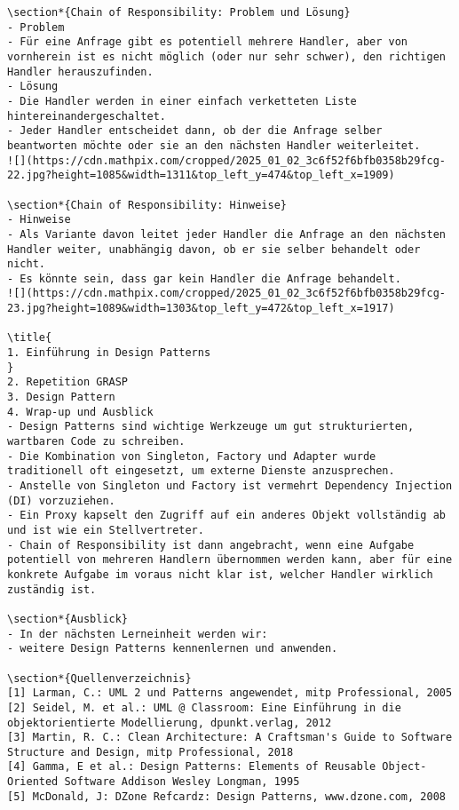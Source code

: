 \documentclass[10pt]{article}
\begin{document}
\begin{verbatim}
\section*{Chain of Responsibility: Problem und Lösung}
- Problem
- Für eine Anfrage gibt es potentiell mehrere Handler, aber von vornherein ist es nicht möglich (oder nur sehr schwer), den richtigen Handler herauszufinden.
- Lösung
- Die Handler werden in einer einfach verketteten Liste hintereinandergeschaltet.
- Jeder Handler entscheidet dann, ob der die Anfrage selber beantworten möchte oder sie an den nächsten Handler weiterleitet.
![](https://cdn.mathpix.com/cropped/2025_01_02_3c6f52f6bfb0358b29fcg-22.jpg?height=1085&width=1311&top_left_y=474&top_left_x=1909)

\section*{Chain of Responsibility: Hinweise}
- Hinweise
- Als Variante davon leitet jeder Handler die Anfrage an den nächsten Handler weiter, unabhängig davon, ob er sie selber behandelt oder nicht.
- Es könnte sein, dass gar kein Handler die Anfrage behandelt.
![](https://cdn.mathpix.com/cropped/2025_01_02_3c6f52f6bfb0358b29fcg-23.jpg?height=1089&width=1303&top_left_y=472&top_left_x=1917)

\title{
1. Einführung in Design Patterns
}
2. Repetition GRASP
3. Design Pattern
4. Wrap-up und Ausblick
- Design Patterns sind wichtige Werkzeuge um gut strukturierten, wartbaren Code zu schreiben.
- Die Kombination von Singleton, Factory und Adapter wurde traditionell oft eingesetzt, um externe Dienste anzusprechen.
- Anstelle von Singleton und Factory ist vermehrt Dependency Injection (DI) vorzuziehen.
- Ein Proxy kapselt den Zugriff auf ein anderes Objekt vollständig ab und ist wie ein Stellvertreter.
- Chain of Responsibility ist dann angebracht, wenn eine Aufgabe potentiell von mehreren Handlern übernommen werden kann, aber für eine konkrete Aufgabe im voraus nicht klar ist, welcher Handler wirklich zuständig ist.

\section*{Ausblick}
- In der nächsten Lerneinheit werden wir:
- weitere Design Patterns kennenlernen und anwenden.

\section*{Quellenverzeichnis}
[1] Larman, C.: UML 2 und Patterns angewendet, mitp Professional, 2005
[2] Seidel, M. et al.: UML @ Classroom: Eine Einführung in die objektorientierte Modellierung, dpunkt.verlag, 2012
[3] Martin, R. C.: Clean Architecture: A Craftsman's Guide to Software Structure and Design, mitp Professional, 2018
[4] Gamma, E et al.: Design Patterns: Elements of Reusable Object-Oriented Software Addison Wesley Longman, 1995
[5] McDonald, J: DZone Refcardz: Design Patterns, www.dzone.com, 2008
\end{verbatim}
\end{document}
